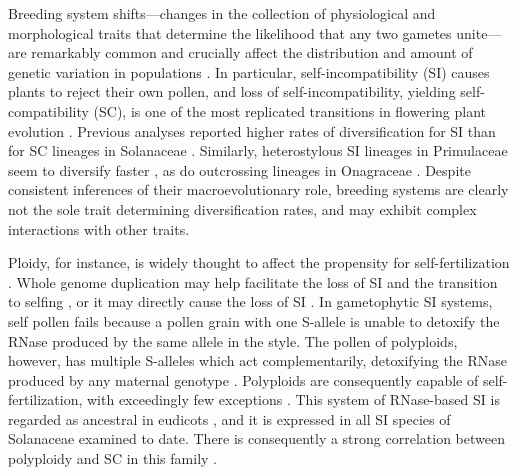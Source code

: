 Breeding system shifts---changes in the collection of physiological and morphological traits that determine the likelihood that any two gametes unite---are remarkably common and crucially affect the distribution and amount of genetic variation in populations \citep{stebbins1974, barrett2013}.
In particular, self-incompatibility (SI) causes plants to reject their own pollen, and loss of self-incompatibility, yielding self-compatibility (SC), is one of the most replicated transitions in flowering plant evolution \citep{stebbins1974, igic_2008}.
Previous analyses reported higher rates of diversification for SI than for SC lineages in Solanaceae \citep{goldberg_2010}. 
Similarly, heterostylous SI lineages in Primulaceae seem to diversify faster \citep{devos2014}, as do outcrossing lineages in Onagraceae \citep{freyman_2018}.
Despite consistent inferences of their macroevolutionary role, breeding systems are clearly not the sole trait determining diversification rates, and may exhibit complex interactions with other traits.

Ploidy, for instance, is widely thought to affect the propensity for self-fertilization \citep{stebbins1950}. 
Whole genome duplication may help facilitate the loss of SI and the transition to selfing \citep{barringer2007, barrett2008, husband2008}, or it may directly cause the loss of SI \citep{stout1942, lewis1947}.
In gametophytic SI systems, self pollen fails because a pollen grain with one S-allele is unable to detoxify the RNase produced by the same allele in the style. %
The pollen of polyploids, however, has multiple S-alleles which act complementarily, detoxifying the RNase produced by any maternal genotype \citep{entani1999, tsukamoto2005, kubo2010}.
Polyploids are consequently capable of self-fertilization, with exceedingly few exceptions \citep{hauck_2002, nunes_2006}.
This system of RNase-based SI is regarded as ancestral in eudicots \citep{igic_2001,steinbachs_2002}, and it is expressed in all SI species of Solanaceae examined to date.
There is consequently a strong correlation between polyploidy and SC in this family \citep{robertson_2011}.

